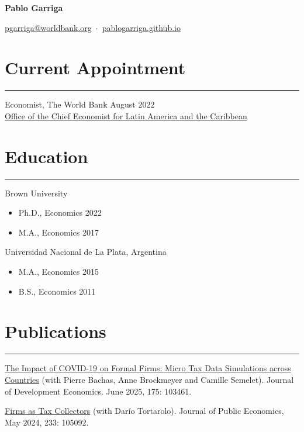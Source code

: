 \documentclass[a4paper,11pt]{article}
\newcommand{\sectitle}[1]{
    \vspace{1.5ex}
    \section{#1}
    \vspace{-2.5ex}
    \noindent\rule{\textwidth}{0.5pt}
    \vspace{-4ex}
}
\begin{document}

\begin{minipage}{\textwidth}
    \vspace{7ex}
        \par{
        \centering
        \vspace{-0.9in}
            \textbf{{\Large Pablo Garriga}}

            \href{mailto:pgarriga@worldbank.org}{pgarriga@worldbank.org} \,$\cdot$\, \href{https://pablogarriga.github.io/}{pablogarriga.github.io}
            
        \par}
\end{minipage}


\sectitle{Current Appointment}

Economist, The World Bank \hfill August 2022\\
\href{https://www.worldbank.org/en/region/lac/brief/lac-chief-economist}{Office of the Chief Economist for Latin America and the Caribbean}

\sectitle{Education}

Brown University
\begin{itemize}
    \item[] Ph.D., Economics \hfill 2022
    \item[] M.A., Economics \hfill 2017
\end{itemize}

Universidad Nacional de La Plata, Argentina
\begin{itemize}
    \item[] M.A., Economics \hfill 2015
    \item[] B.S., Economics \hfill 2011
\end{itemize}
\sectitle{Publications}

\href{https://doi.org/10.1016/j.jdeveco.2025.103461}{The Impact of COVID-19 on Formal Firms: Micro Tax Data Simulations across Countries}
(with Pierre Bachas, Anne Brockmeyer and Camille Semelet). Journal of Development Economics. June 2025, 175: 103461.

\href{https://doi.org/10.1016/j.jpubeco.2024.105092}{Firms as Tax Collectors}
(with Darío Tortarolo). Journal of Public Economics, May 2024, 233: 105092.
\end{document}
